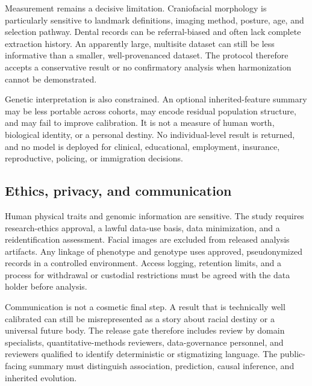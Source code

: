 \documentclass[conference]{IEEEtran}
\begin{document}
Measurement remains a decisive limitation. Craniofacial morphology is
particularly sensitive to landmark definitions, imaging method, posture, age,
and selection pathway. Dental records can be referral-biased and often lack
complete extraction history. An apparently large, multisite dataset can still
be less informative than a smaller, well-provenanced dataset. The protocol
therefore accepts a conservative result or no confirmatory analysis when
harmonization cannot be demonstrated.

Genetic interpretation is also constrained. An optional inherited-feature
summary may be less portable across cohorts, may encode residual population
structure, and may fail to improve calibration. It is not a measure of human
worth, biological identity, or a personal destiny. No individual-level result
is returned, and no model is deployed for clinical, educational, employment,
insurance, reproductive, policing, or immigration decisions.

\subsection{Ethics, privacy, and communication}

Human physical traits and genomic information are sensitive. The study
requires research-ethics approval, a lawful data-use basis, data minimization,
and a reidentification assessment. Facial images are excluded from released
analysis artifacts. Any linkage of phenotype and genotype uses approved,
pseudonymized records in a controlled environment. Access logging, retention
limits, and a process for withdrawal or custodial restrictions must be agreed
with the data holder before analysis.

Communication is not a cosmetic final step. A result that is technically well
calibrated can still be misrepresented as a story about racial destiny or a
universal future body. The release gate therefore includes review by domain
specialists, quantitative-methods reviewers, data-governance personnel, and
reviewers qualified to identify deterministic or stigmatizing language. The
public-facing summary must distinguish association, prediction, causal
inference, and inherited evolution.
\end{document}
